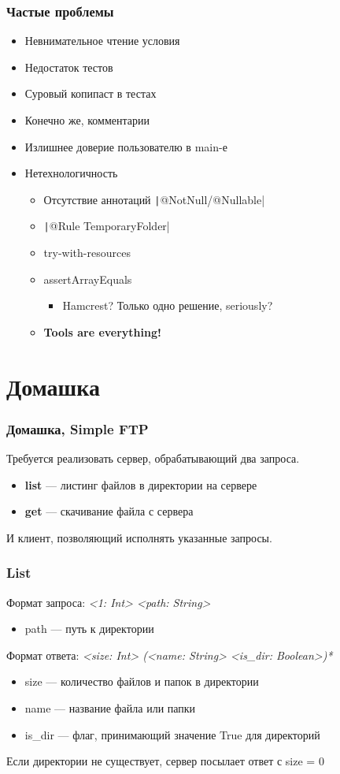 \documentclass[xetex,mathserif,serif]{beamer}
\begin{document}
	\begin{frame}
		\frametitle{Частые проблемы}
		\begin{itemize}
			\item Невнимательное чтение условия
			\item Недостаток тестов
			\item Суровый копипаст в тестах
			\item Конечно же, комментарии
			\item Излишнее доверие пользователю в main-е
			\item Нетехнологичность
			\begin{itemize}
				\item Отсутствие аннотаций \texttt|@NotNull/@Nullable|
				\item \texttt|@Rule TemporaryFolder|
				\item try-with-resources
				\item assertArrayEquals
				\begin{itemize}
					\item Hamcrest? Только одно решение, seriously?
				\end{itemize}
				\item \textbf{Tools are everything!}
			\end{itemize}
		\end{itemize}
	\end{frame}

	\section{Домашка}

	\begin{frame}
		\frametitle{Домашка, Simple FTP}
		Требуется реализовать сервер, обрабатывающий два запроса.
		\begin{itemize}
			\item \textbf{list} --- листинг файлов в директории на сервере
			\item \textbf{get} --- скачивание файла с сервера
		\end{itemize}
		И клиент, позволяющий исполнять указанные запросы.
	\end{frame}

	\begin{frame}
		\frametitle{List}
		Формат запроса: \textit{<1: Int> <path: String>}

		\begin{itemize}
			\item path --- путь к директории
		\end{itemize}

		Формат ответа: \textit{<size: Int> (<name: String> <is\_dir: Boolean>)*}

		\begin{itemize}
			\item size --- количество файлов и папок в директории
			\item name --- название файла или папки
			\item is\_dir --- флаг, принимающий значение True для директорий
		\end{itemize}
		Если директории не существует, сервер посылает ответ с size = 0
	\end{frame}
\end{document}
